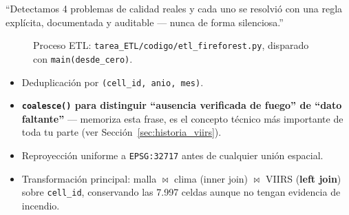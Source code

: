 \documentclass[11pt,a4paper]{article}
\begin{document}
\begin{decirbox}
``Detectamos 4 problemas de calidad reales y cada uno se resolvi\'o con una regla expl\'icita, documentada y auditable --- nunca de forma silenciosa.''
\end{decirbox}

\begin{figure}[H]
\centering
{}
\caption{Proceso ETL: \texttt{tarea\_ETL/codigo/etl\_fireforest.py}, disparado con \texttt{main(desde\_cero)}.}
\end{figure}

\begin{decirbox}[title={Qué decir (reglas clave)}]
\begin{itemize}
    \item Deduplicaci\'on por \texttt{(cell\_id, anio, mes)}.
    \item \textbf{\texttt{coalesce()} para distinguir ``ausencia verificada de fuego'' de ``dato faltante''} --- memoriza esta frase, es el concepto t\'ecnico m\'as importante de toda tu parte (ver Secci\'on~\ref{sec:historia_viirs}).
    \item Reproyecci\'on uniforme a \texttt{EPSG:32717} antes de cualquier uni\'on espacial.
    \item Transformaci\'on principal: malla $\bowtie$ clima (inner join) $\bowtie$ VIIRS (\textbf{left join}) sobre \texttt{cell\_id}, conservando las 7.997 celdas aunque no tengan evidencia de incendio.
\end{itemize}
\end{decirbox}
\end{document}
